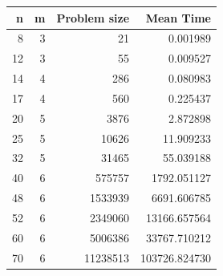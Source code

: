 \begin{tabular}{rrrr}
\toprule
n & m & Problem size & Mean Time \\
\midrule
8 & 3 & 21 & 0.001989 \\
12 & 3 & 55 & 0.009527 \\
14 & 4 & 286 & 0.080983 \\
17 & 4 & 560 & 0.225437 \\
20 & 5 & 3876 & 2.872898 \\
25 & 5 & 10626 & 11.909233 \\
32 & 5 & 31465 & 55.039188 \\
40 & 6 & 575757 & 1792.051127 \\
48 & 6 & 1533939 & 6691.606785 \\
52 & 6 & 2349060 & 13166.657564 \\
60 & 6 & 5006386 & 33767.710212 \\
70 & 6 & 11238513 & 103726.824730 \\
\bottomrule
\end{tabular}
